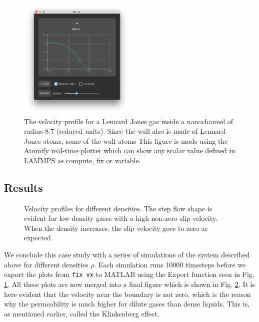 \documentclass[aps,pre,twocolumn,letterpaper,floatfix,nofootinbib]{revtex4}
\newcommand{\code}[1]{\colorbox{light-gray}{\color{RawSienna}\texttt{#1}}}
\begin{document}
\begin{figure}
	\centering
	\includegraphics[width=0.5\textwidth]{lj_flow/08_velocity_profile1.png}
	\caption{
		The velocity profile for a Lennard Jones gas inside a nanochannel of radius 8.7 (reduced units).
		Since the wall also is made of Lennard Jones atoms, some of the wall atoms
		This figure is made using the Atomify real-time plotter which can show any scalar value defined in LAMMPS
		as compute, fix or variable.
    }
	\label{fig:velocity_profile1}
\end{figure}

\subsection{Results}

\begin{figure}
	\centering
	\caption{
		Velocity profiles for different densities.
		The step flow shape is evident for low density gases with a high non-zero slip velocity.
		When the density increases, the slip velocity goes to zero as expected.
    }
	\label{fig:velocity_profiles}
\end{figure}

We conclude this case study with a series of simulations of the system described above for different densities $\rho$.
Each simulation runs 10000 timesteps before we export the plots from \code{fix vx} to MATLAB using the Export function seen in Fig. \ref{fig:velocity_profile1}.
All these plots are now merged into a final figure which is shown in Fig. \ref{fig:velocity_profiles}.
It is here evident that the velocity near the boundary is not zero, which is the reason why the permeability is much higher for dilute gases than dense liquids.
This is, as mentioned earlier, called the Klinkenberg effect\citep{klinkenberg1941permeability}.
\end{document}
